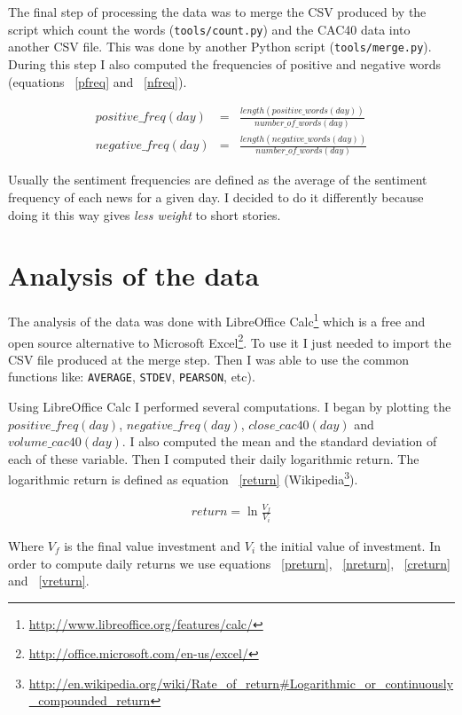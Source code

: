 \documentclass[12pt]{report}
\begin{document}
				The final step of processing the data was to merge the CSV produced by the script which count the words (\lstinline!tools/count.py!) and the CAC40 data into another CSV file. This was done by another Python script (\lstinline!tools/merge.py!). During this step I also computed the frequencies of positive and negative words (equations ~\ref{pfreq} and ~\ref{nfreq}).
			
			\begin{eqnarray}
				positive\_freq(day) &=& \frac{length(positive\_words(day))}{number\_of\_words(day)}\label{pfreq}\\
				negative\_freq(day) &=& \frac{length(negative\_words(day))}{number\_of\_words(day)}\label{nfreq}
			\end{eqnarray}
			
			Usually the sentiment frequencies are defined as the average of the sentiment frequency of each news for a given day. I decided to do it differently because doing it this way gives \emph{less weight} to short stories.
			
		\section{Analysis of the data}
			
			The analysis of the data was done with LibreOffice Calc\footnote{\url{http://www.libreoffice.org/features/calc/}} which is a free and open source alternative to Microsoft Excel\footnote{\url{http://office.microsoft.com/en-us/excel/}}. To use it I just needed to import the  CSV file produced at the merge step. Then I was able to use the common functions like: \lstinline!AVERAGE!, \lstinline!STDEV!, \lstinline!PEARSON!, etc).
			
			Using LibreOffice Calc I performed several computations. I began by plotting the $positive\_freq(day)$, $negative\_freq(day)$, $close\_cac40(day)$ and $volume\_cac40(day)$. I also computed the mean and the standard deviation of each of these variable. Then I computed their daily logarithmic return. The logarithmic return is defined as equation ~\ref{return} (Wikipedia\footnote{\url{http://en.wikipedia.org/wiki/Rate_of_return\#Logarithmic_or_continuously_compounded_return}}).
			
			\begin{eqnarray}
				return = \ln\frac{V_f}{V_i}\label{return}
			\end{eqnarray}
			
			Where $V_f$ is the final value investment and $V_i$ the initial value of investment. In order to compute daily returns we use equations ~\ref{preturn}, ~\ref{nreturn}, ~\ref{creturn} and ~\ref{vreturn}.
			
\end{document}
